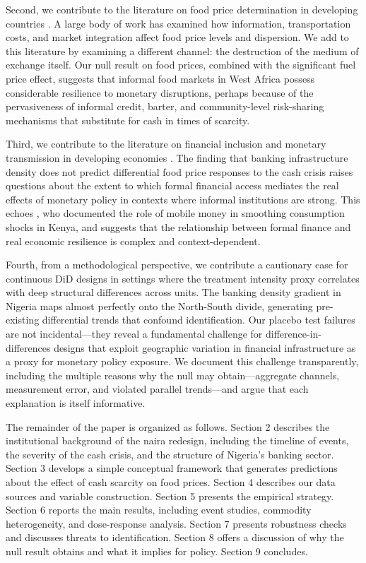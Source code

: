 \documentclass[12pt]{article}
\begin{document}
Second, we contribute to the literature on food price determination in developing countries \citep{deaton1989rice, atkin2015trade, aker2010information, jensen2007digital}. A large body of work has examined how information, transportation costs, and market integration affect food price levels and dispersion. We add to this literature by examining a different channel: the destruction of the medium of exchange itself. Our null result on food prices, combined with the significant fuel price effect, suggests that informal food markets in West Africa possess considerable resilience to monetary disruptions, perhaps because of the pervasiveness of informal credit, barter, and community-level risk-sharing mechanisms that substitute for cash in times of scarcity.

Third, we contribute to the literature on financial inclusion and monetary transmission in developing economies \citep{jack2014risk, suri2017long, aker2017payment}. The finding that banking infrastructure density does not predict differential food price responses to the cash crisis raises questions about the extent to which formal financial access mediates the real effects of monetary policy in contexts where informal institutions are strong. This echoes \citet{jack2014risk}, who documented the role of mobile money in smoothing consumption shocks in Kenya, and suggests that the relationship between formal finance and real economic resilience is complex and context-dependent.

Fourth, from a methodological perspective, we contribute a cautionary case for continuous DiD designs in settings where the treatment intensity proxy correlates with deep structural differences across units. The banking density gradient in Nigeria maps almost perfectly onto the North-South divide, generating pre-existing differential trends that confound identification. Our placebo test failures are not incidental---they reveal a fundamental challenge for difference-in-differences designs that exploit geographic variation in financial infrastructure as a proxy for monetary policy exposure. We document this challenge transparently, including the multiple reasons why the null may obtain---aggregate channels, measurement error, and violated parallel trends---and argue that each explanation is itself informative.

The remainder of the paper is organized as follows. Section 2 describes the institutional background of the naira redesign, including the timeline of events, the severity of the cash crisis, and the structure of Nigeria's banking sector. Section 3 develops a simple conceptual framework that generates predictions about the effect of cash scarcity on food prices. Section 4 describes our data sources and variable construction. Section 5 presents the empirical strategy. Section 6 reports the main results, including event studies, commodity heterogeneity, and dose-response analysis. Section 7 presents robustness checks and discusses threats to identification. Section 8 offers a discussion of why the null result obtains and what it implies for policy. Section 9 concludes.
\end{document}
